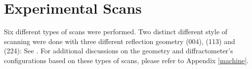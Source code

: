 \section{Experimental Scans}

Six different types of scans were performed.  Two distinct different style of scanning were done with three different reflection geometry (004), (113) and (224):  See .  For additional discussions on the geometry and diffractometer's configurations based on these types of scans, please refer to Appendix \ref{machine}.  

%
%
%
%
%
%
%
%



